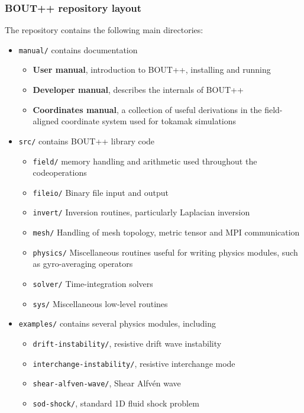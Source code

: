 \documentclass{beamer}
\begin{document}
\begin{frame}
  \frametitle{BOUT++ repository layout}
  
  The repository contains the following main directories:
  \begin{itemize}
  \item \texttt{manual/}   contains documentation
     {
      \begin{itemize}
      \item {\bf User manual}, introduction to BOUT++, installing and running
      \item {\bf Developer manual}, describes the internals of BOUT++
      \item {\bf Coordinates manual}, a collection of useful derivations in
	the field-aligned coordinate system used for tokamak simulations
      \end{itemize}
    }
  \item<2-> \texttt{src/}  contains BOUT++ library code
     {
      \begin{itemize}
      \item \texttt{field/}  memory handling and arithmetic  used throughout the codeoperations
      \item \texttt{fileio/}  Binary file input and output
      \item \texttt{invert/}  Inversion routines, particularly Laplacian inversion
      \item \texttt{mesh/}   Handling of mesh topology, metric tensor and MPI communication
      \item \texttt{physics/}  Miscellaneous routines useful for writing physics modules, such as gyro-averaging operators
      \item \texttt{solver/}   Time-integration solvers
      \item \texttt{sys/}    Miscellaneous low-level routines
      \end{itemize}
    }
  \item<3-> \texttt{examples/}  contains several physics modules, including
     {
      \begin{itemize}
      \item \texttt{drift-instability/}, resistive drift wave instability
      \item \texttt{interchange-instability/}, resistive interchange mode
      \item \texttt{shear-alfven-wave/}, Shear Alfv\'en wave
      \item \texttt{sod-shock/}, standard 1D fluid shock problem

\end{itemize}}
\end{itemize}
\end{frame}
\end{document}
